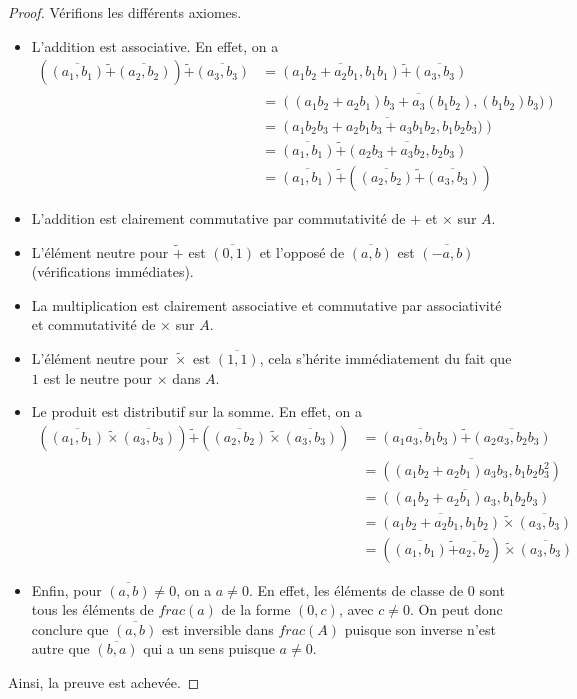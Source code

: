 \documentclass[french]{book}
\theoremstyle{plain}
\theoremstyle{definition}
\theoremstyle{remark}
\begin{document}
\begin{proof}
	Vérifions les différents axiomes.
	\begin{itemize}
		\item L'addition est associative. En effet, on a 
		\begin{align*}
			\left(\overline{(a_1,b_1)}\tilde{+}\overline{(a_2,b_2)}\right)\tilde{+}\overline{(a_3,b_3)}&=\overline{(a_1b_2+a_2b_1,b_1b_1)}\tilde{+}\overline{(a_3,b_3)} \\
			&= \overline{\left((a_1b_2+a_2b_1)b_3+a_3(b_1b_2),(b_1b_2)b_3)\right)}\\
			&= \overline{\left(a_1b_2b_3+a_2b_1b_3+a_3b_1b_2,b_1b_2b_3)\right)} \\
			&= \overline{(a_1,b_1)}\tilde{+} \overline{(a_2b_3+a_3b_2,b_2b_3)}\\
			&=\overline{(a_1,b_1)}\tilde{+}\left(\overline{(a_2,b_2)}\tilde{+}\overline{(a_3,b_3)}\right)
		\end{align*}
		\item L'addition est clairement commutative par commutativité de $+$ et $\times$ sur $A$.
		\item L'élément neutre pour $\tilde{+}$ est $\overline{(0,1)}$ et l'opposé de $\overline{(a,b)}$ est $\overline{(-a,b)}$ (vérifications immédiates).
		\item La multiplication est clairement associative et commutative par associativité et commutativité de $\times$ sur $A$.
		\item L'élément neutre pour $\tilde{\times}$ est $\overline{(1,1)}$, cela s'hérite immédiatement du fait que $1$ est le neutre pour $\times$ dans $A$.
		\item Le produit est distributif sur la somme. En effet, on a \begin{align*}
			\left(\overline{(a_1,b_1)}\tilde{\times}\overline{(a_3,b_3)}\right)\tilde{+}\left(\overline{(a_2,b_2)}\tilde{\times}\overline{(a_3,b_3)}\right)&=\overline{(a_1a_3,b_1b_3)}\tilde{+}\overline{(a_2a_3,b_2b_3)}\\
			&=\overline{((a_1b_2+a_2b_1)a_3b_3,b_1b_2b_3^2)}\\
			&=\overline{((a_1b_2+a_2b_1)a_3,b_1b_2b_3)}\\
			&=\overline{(a_1b_2+a_2b_1,b_1b_2)}\tilde{\times}\overline{(a_3,b_3)} \\
			&=\left(\overline{(a_1,b_1)}\tilde{+}\overline{a_2,b_2}\right)\tilde{\times}\overline{(a_3,b_3)}
		\end{align*}
		\item Enfin, pour $\overline{(a,b)}\ne0$, on a $a\ne0$. En effet, les éléments de classe de $0$ sont tous les éléments de $frac(a)$ de la forme $(0,c)$, avec $c\ne0$. On peut donc conclure que $\overline{(a,b)}$ est inversible dans $frac(A)$ puisque son inverse n'est autre que $\overline{(b,a)}$ qui a un sens puisque $a\ne0$.
	\end{itemize}
	Ainsi, la preuve est achevée.
\end{proof}
\end{document}
